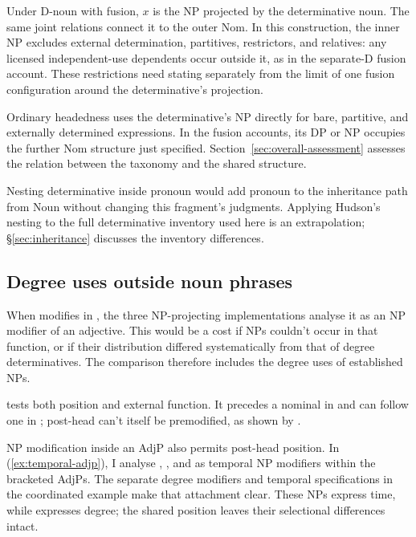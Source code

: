 \documentclass[12pt]{article}
\begin{document}
Under D-noun with fusion, $x$ is the NP projected by the determinative noun. The same joint relations connect it to the outer Nom. In this construction, the inner NP excludes external determination, partitives, restrictors, and relatives: any licensed independent-use dependents occur outside it, as in the separate-D fusion account. These restrictions need stating separately from the limit of one fusion configuration around the determinative's projection.

Ordinary headedness uses the determinative's NP directly for bare, partitive, and externally determined expressions. In the fusion accounts, its DP or NP occupies the further Nom structure just specified. Section~\ref{sec:overall-assessment} assesses the relation between the taxonomy and the shared structure.

Nesting determinative inside pronoun would add pronoun to the inheritance path from Noun without changing this fragment's judgments. Applying Hudson's nesting to the full determinative inventory used here is an extrapolation; §\ref{sec:inheritance} discusses the inventory differences.

\subsection{Degree uses outside noun phrases}\label{sec:enough}

When  modifies  in , the three NP-projecting implementations analyse it as an NP modifier of an adjective. This would be a cost if NPs couldn't occur in that function, or if their distribution differed systematically from that of degree determinatives. The comparison therefore includes the degree uses of established NPs.

 tests both position and external function. It precedes a nominal in  and can follow one in ; post-head  can't itself be premodified, as shown by  \citep[396--397, 445]{huddleston2002}.

NP modification inside an AdjP also permits post-head position. In (\ref{ex:temporal-adjp}), I analyse , , and  as temporal NP modifiers within the bracketed AdjPs. The separate degree modifiers and temporal specifications in the coordinated example make that attachment clear. These NPs express time, while  expresses degree; the shared position leaves their selectional differences intact.
\end{document}
